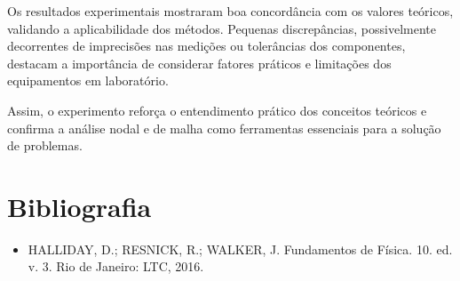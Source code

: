 \documentclass[a4 paper]{article}
\begin{document}
Os resultados experimentais mostraram boa concordância com os valores teóricos, validando a aplicabilidade dos métodos. Pequenas discrepâncias, possivelmente decorrentes de imprecisões nas medições ou tolerâncias dos componentes, destacam a importância de considerar fatores práticos e limitações dos equipamentos em laboratório.

Assim, o experimento reforça o entendimento prático dos conceitos teóricos e confirma a análise nodal e de malha como ferramentas essenciais para a solução de problemas.


\vspace{40pt}
\section{Bibliografia}
\begin{itemize}
\item HALLIDAY, D.; RESNICK, R.; WALKER, J. Fundamentos de Física. 10. ed. v. 3. Rio de Janeiro: LTC, 2016.
\end{itemize}
\end{document}
